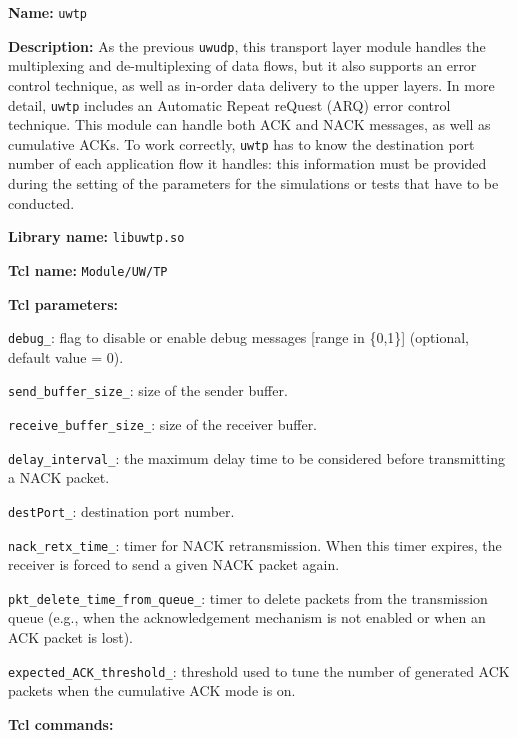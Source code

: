 \vspace{1 cm}

\begin{description}
   \item {\bf Name:} {\tt uwtp}
   \item {\bf Description:} As the previous {\tt uwudp}, this transport layer module handles the multiplexing and de-multiplexing of data    	flows, but it also supports an error control technique, as well as in-order data delivery to the upper layers. In more detail, {\tt uwtp} includes an Automatic Repeat reQuest (ARQ) error control technique.  This module can handle both ACK and NACK messages, as well as cumulative ACKs. To work correctly, {\tt uwtp} has to know the destination port number of each application flow it handles: this information must be provided during the setting of the parameters for the simulations or tests that have to be conducted.
   \item {\bf Library name:} {\tt libuwtp.so}
   \item {\bf Tcl name:} {\tt Module/UW/TP}
   \item {\bf Tcl parameters:} 
    \begin{description}
      \item{\tt debug\_}: flag to disable or enable debug messages [range in \{0,1\}] (optional, default value = 0).
      \item{\tt send\_buffer\_size\_}: size of the sender buffer. 
      \item{\tt receive\_buffer\_size\_}: size of the receiver buffer.
      \item{\tt delay\_interval\_}: the maximum delay time to be considered before transmitting a NACK packet.
      \item{\tt destPort\_}: destination port number.
      \item{\tt nack\_retx\_time\_}: timer for NACK retransmission. When this timer expires, the receiver is forced to send a given NACK packet again.
      \item{\tt pkt\_delete\_time\_from\_queue\_}: timer to delete packets from the transmission queue (e.g., when the acknowledgement mechanism is not enabled or when an ACK packet is lost).
      \item{\tt expected\_ACK\_threshold\_}: threshold used to tune the number of generated ACK packets when the cumulative ACK mode is on.\end{description}
   \item {\bf Tcl commands:}
    \begin{description}

\end{description}
\end{description}
